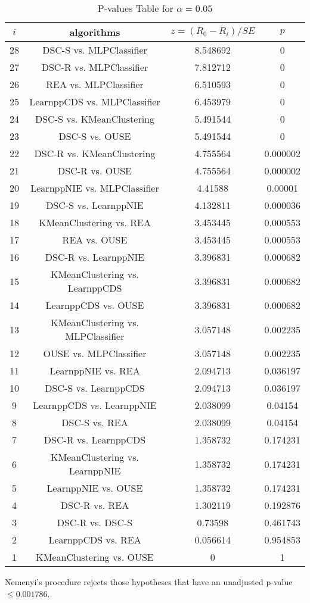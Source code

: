 \documentclass[a4paper,10pt]{article}
\begin{document}
\begin{landscape}
\begin{table}[!htp]
\centering\scriptsize
\begin{tabular}{cccc}
$i$&algorithms&$z=(R_0 - R_i)/SE$&$p$\\
\hline28&DSC-S vs. MLPClassifier&8.548692&0\\
27&DSC-R vs. MLPClassifier&7.812712&0\\
26&REA vs. MLPClassifier&6.510593&0\\
25&LearnppCDS vs. MLPClassifier&6.453979&0\\
24&DSC-S vs. KMeanClustering&5.491544&0\\
23&DSC-S vs. OUSE&5.491544&0\\
22&DSC-R vs. KMeanClustering&4.755564&0.000002\\
21&DSC-R vs. OUSE&4.755564&0.000002\\
20&LearnppNIE vs. MLPClassifier&4.41588&0.00001\\
19&DSC-S vs. LearnppNIE&4.132811&0.000036\\
18&KMeanClustering vs. REA&3.453445&0.000553\\
17&REA vs. OUSE&3.453445&0.000553\\
16&DSC-R vs. LearnppNIE&3.396831&0.000682\\
15&KMeanClustering vs. LearnppCDS&3.396831&0.000682\\
14&LearnppCDS vs. OUSE&3.396831&0.000682\\
13&KMeanClustering vs. MLPClassifier&3.057148&0.002235\\
12&OUSE vs. MLPClassifier&3.057148&0.002235\\
11&LearnppNIE vs. REA&2.094713&0.036197\\
10&DSC-S vs. LearnppCDS&2.094713&0.036197\\
9&LearnppCDS vs. LearnppNIE&2.038099&0.04154\\
8&DSC-S vs. REA&2.038099&0.04154\\
7&DSC-R vs. LearnppCDS&1.358732&0.174231\\
6&KMeanClustering vs. LearnppNIE&1.358732&0.174231\\
5&LearnppNIE vs. OUSE&1.358732&0.174231\\
4&DSC-R vs. REA&1.302119&0.192876\\
3&DSC-R vs. DSC-S&0.73598&0.461743\\
2&LearnppCDS vs. REA&0.056614&0.954853\\
1&KMeanClustering vs. OUSE&0&1\\
\hline
\end{tabular}
\caption{P-values Table for $\alpha=0.05$}
\end{table}Nemenyi's procedure rejects those hypotheses that have an unadjusted p-value $\le0.001786$.


\end{landscape}
\end{document}
